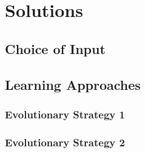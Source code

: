 \section{Solutions}
\subsection{Choice of Input}
\subsection{Learning Approaches}
\subsubsection{Evolutionary Strategy 1}
\subsubsection{Evolutionary Strategy 2}